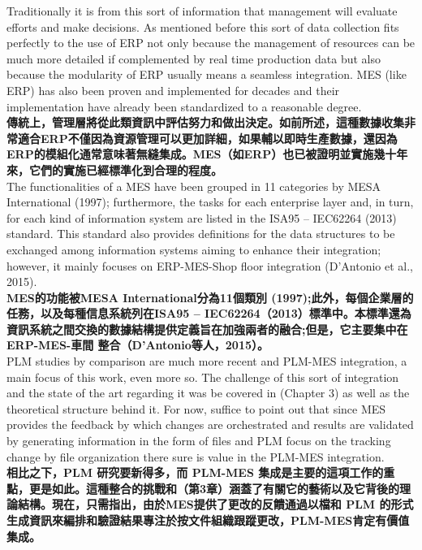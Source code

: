 \documentclass[24pt]{article} %
\begin{document}
Traditionally it is from this sort of information that management will evaluate efforts and make decisions. As mentioned before this sort of data collection fits perfectly to the use of ERP not only because the management of resources can be much more detailed if complemented by real time production data but also because the modularity of ERP usually means a seamless integration. MES (like ERP) has also been proven and implemented for decades and their implementation have already been standardized to a reasonable degree. \\

\textbf{傳統上，管理層將從此類資訊中評估努力和做出決定。如前所述，這種數據收集非常適合ERP不僅因為資源管理可以更加詳細，如果輔以即時生產數據，還因為ERP的模組化通常意味著無縫集成。MES（如ERP）也已被證明並實施幾十年來，它們的實施已經標準化到合理的程度。}\\

The functionalities of a MES have been grouped in 11 categories by MESA International (1997); furthermore, the tasks for each enterprise layer and, in turn, for each kind of information system are listed in the ISA95 – IEC62264 (2013) standard. This standard also provides definitions for the data structures to be exchanged among information systems aiming to enhance their integration; however, it mainly focuses on ERP-MES-Shop floor integration (D’Antonio et al., 2015).\\

\textbf{MES的功能被MESA International分為11個類別 (1997);此外，每個企業層的任務，以及每種信息系統列在ISA95 – IEC62264（2013）標準中。本標準還為資訊系統之間交換的數據結構提供定義旨在加強兩者的融合;但是，它主要集中在ERP-MES-車間 整合（D'Antonio等人，2015）。}\\

PLM studies by comparison are much more recent and PLM-MES integration, a main focus of this work, even more so. The challenge of this sort of integration and the state of the art regarding it was be covered in (Chapter 3) as well as the theoretical structure behind it. For now, suffice to point out that since MES provides the feedback by which changes are orchestrated and results are validated by generating information in the form of files and PLM focus on the tracking change by file organization there sure is value in the PLM-MES integration.\\

\textbf{相比之下，PLM 研究要新得多，而 PLM-MES 集成是主要的這項工作的重點，更是如此。這種整合的挑戰和（第3章）涵蓋了有關它的藝術以及它背後的理論結構。現在，只需指出，由於MES提供了更改的反饋通過以檔和 PLM 的形式生成資訊來編排和驗證結果專注於按文件組織跟蹤更改，PLM-MES肯定有價值集成。}\\
\end{document}
